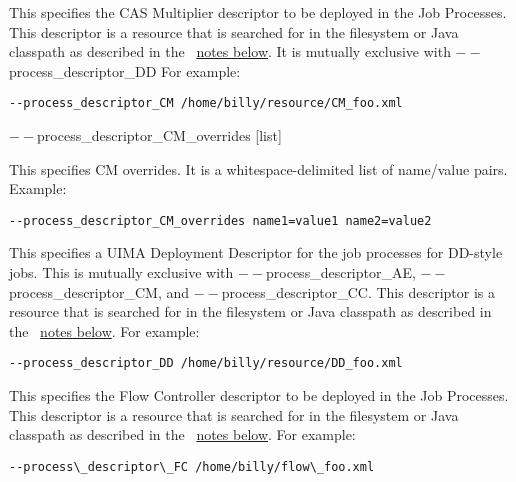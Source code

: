 \begin{description}
           \item[$--$process\_descriptor\_CM {[descriptor]} ]

             This specifies the CAS Multiplier descriptor to be deployed in the Job Processes. This 
             descriptor is a resource that is searched for in the filesystem or Java classpath as described 
             in the ~\hyperref[par:cli.submit.notes]{notes below}.
             It is mutually exclusive with $--$process\_descriptor\_DD For example: 
             \begin{verbatim}             
--process_descriptor_CM /home/billy/resource/CM_foo.xml 
             \end{verbatim}

           \begin{sloppypar}             
           \item[$--$process\_descriptor\_CM\_overrides {[list]}  ]

             This specifies CM overrides. It is a whitespace-delimited list of name/value pairs. Example: 
\begin{verbatim}
--process_descriptor_CM_overrides name1=value1 name2=value2 
\end{verbatim}
           \end{sloppypar}
           
           \item[$--$process\_descriptor\_DD {[descriptor]}  ]

             This specifies a UIMA Deployment Descriptor for the job processes for DD-style jobs. 
             This is mutually exclusive with $--$process\_descriptor\_AE, $--$process\_descriptor\_CM, 
             and $--$process\_descriptor\_CC. This 
             descriptor is a resource that is searched for in the filesystem or Java classpath as described 
             in the ~\hyperref[par:cli.submit.notes]{notes below}.
             For example:
             \begin{verbatim}
--process_descriptor_DD /home/billy/resource/DD_foo.xml 
             \end{verbatim}

           \item[$--$process\_descriptor\_FC {[descriptor]}  ]

             This specifies the Flow Controller descriptor to be deployed in the Job Processes. This 
             descriptor is a resource that is searched for in the filesystem or Java classpath as described 
             in the ~\hyperref[par:cli.submit.notes]{notes below}.
             For example: 
             \begin{verbatim}
--process\_descriptor\_FC /home/billy/flow\_foo.xml 
             \end{verbatim}


\end{description}
